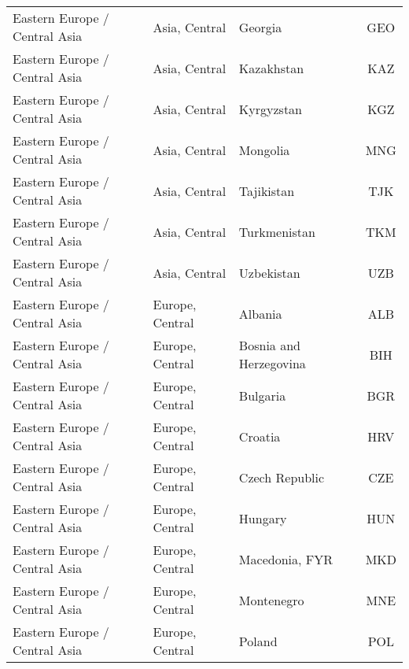 \begin{longtable}{|p{3cm}|p{3.5cm}|p{5cm}|c|}
 Eastern Europe / Central Asia &                Asia, Central &                                           Georgia &  GEO \\
 Eastern Europe / Central Asia &                Asia, Central &                                        Kazakhstan &  KAZ \\
 Eastern Europe / Central Asia &                Asia, Central &                                        Kyrgyzstan &  KGZ \\
 Eastern Europe / Central Asia &                Asia, Central &                                          Mongolia &  MNG \\
 Eastern Europe / Central Asia &                Asia, Central &                                        Tajikistan &  TJK \\
 Eastern Europe / Central Asia &                Asia, Central &                                      Turkmenistan &  TKM \\
 Eastern Europe / Central Asia &                Asia, Central &                                        Uzbekistan &  UZB \\
 Eastern Europe / Central Asia &              Europe, Central &                                           Albania &  ALB \\
 Eastern Europe / Central Asia &              Europe, Central &                            Bosnia and Herzegovina &  BIH \\
 Eastern Europe / Central Asia &              Europe, Central &                                          Bulgaria &  BGR \\
 Eastern Europe / Central Asia &              Europe, Central &                                           Croatia &  HRV \\
 Eastern Europe / Central Asia &              Europe, Central &                                    Czech Republic &  CZE \\
 Eastern Europe / Central Asia &              Europe, Central &                                           Hungary &  HUN \\
 Eastern Europe / Central Asia &              Europe, Central &                                    Macedonia, FYR &  MKD \\
 Eastern Europe / Central Asia &              Europe, Central &                                        Montenegro &  MNE \\
 Eastern Europe / Central Asia &              Europe, Central &                                            Poland &  POL \\

\end{longtable}
